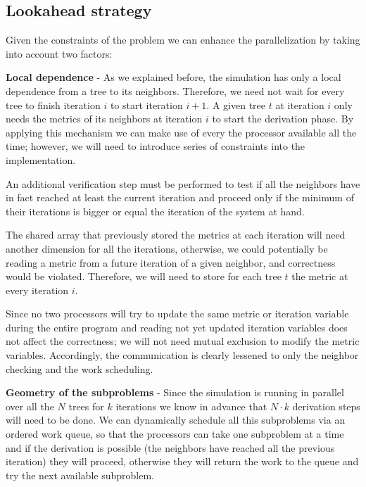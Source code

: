 \documentclass[letterpaper,twoside,11pt]{article}
\begin{document}
\begin{multicols}{2}

\subsection{Lookahead strategy} %
\label{sub:lookahead_startegy}

Given the constraints of the problem we can enhance the parallelization by taking into account two factors:
\begin{compactenum}[a)]
\item \textbf{Local dependence} - As we explained before, the simulation has only a local dependence from a tree to its neighbors. Therefore, we need not wait for every tree to finish iteration $i$ to start iteration $i+1$. A given tree $t$ at iteration $i$ only needs the metrics of its neighbors at iteration $i$ to start the derivation phase. By applying this mechanism we can make use of every the processor available all the time; however, we will need to introduce series of constraints into the implementation.

An additional verification step must be performed to test if all the neighbors have in fact reached at least the current iteration and proceed only if the minimum of their iterations is bigger or equal the iteration of the system at hand.

The shared array that previously stored the metrics at each iteration will need another dimension for all the iterations, otherwise, we could potentially be reading a metric from a future iteration of a given neighbor, and correctness would be violated. Therefore, we will need to store for each tree $t$ the metric at every iteration $i$.

Since no two processors will try to update the same metric or iteration variable during the entire program and reading not yet updated iteration variables does not affect the correctness; we will not need mutual exclusion to modify the metric variables. Accordingly, the communication is clearly lessened to only the neighbor checking and the work scheduling.

\item \textbf{Geometry of the subproblems} - Since the simulation is running in parallel over all the $N$ trees for $k$ iterations we know in advance that $N \cdot k $ derivation steps will need to be done. We can dynamically schedule all this subproblems via an ordered work queue, so that the processors can take one subproblem at a time and if the derivation is possible (the neighbors have reached all the previous iteration) they will proceed, otherwise they will return the work to the queue and try the next available subproblem.


\end{compactenum}
\end{multicols}
\end{document}
